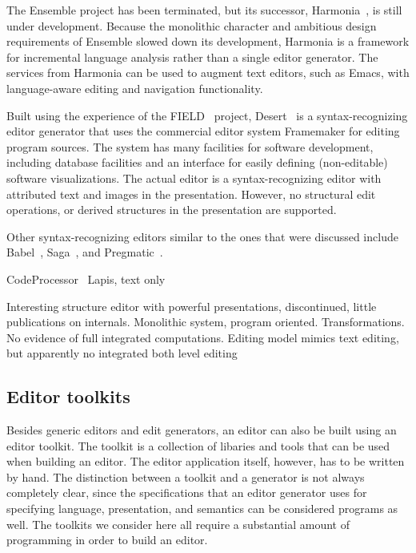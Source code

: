 The Ensemble project has been terminated, but its successor, Harmonia~\cite{boshernitsan01harmonia}, is still under development. Because the monolithic character and ambitious design requirements of Ensemble slowed down its development, Harmonia is a framework for incremental language analysis rather than a single editor generator. The services from Harmonia can be used to augment text editors, such as Emacs, with language-aware editing and navigation functionality.


Built using the experience of the FIELD~\cite{reiss94field} project, Desert~\cite{reiss99desert} is a syntax-recognizing editor generator that uses the commercial editor system Framemaker for editing program sources. The system has many facilities for software development, including database facilities and an interface for easily defining (non-editable) software visualizations. The actual editor is a syntax-recognizing editor with attributed text and images in the presentation. However, no structural edit operations, or derived structures in the presentation are supported.


Other syntax-recognizing editors similar to the ones that were discussed include  Babel~\cite{horton81babel}, Saga~\cite{campbell84saga}, and Pregmatic~\cite{brand92pregmatic}.



\bc
CodeProcessor~\cite{codeprocessor}
Lapis, text only

Interesting structure editor with powerful presentations, discontinued, little publications on
internals. Monolithic system, program oriented. Transformations. No evidence of full 
integrated computations. Editing model mimics text editing, but apparently no integrated
both level editing
\ec


%																
\subsection {Editor toolkits} \label{sect:toolkits}

Besides generic editors and edit generators, an editor can also be built using an editor toolkit. The toolkit is a collection of libaries and tools that can be used when building an editor. The editor application itself, however, has to be written by hand. The distinction between a toolkit and a generator is not always completely clear, since the specifications that an editor generator uses for specifying language, presentation, and semantics can be considered programs as well. The toolkits we consider here all require a substantial amount of programming in order to build an editor.

